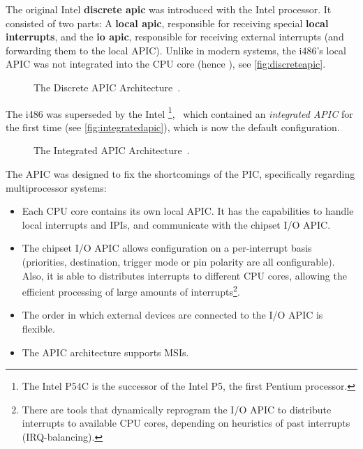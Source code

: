The original Intel  \textbf{\gls{discrete apic}} was introduced with the Intel  processor.
It consisted of two parts: A \textbf{\gls{local apic}}, responsible for receiving special \textbf{\glspl{local interrupt}}, and the \textbf{\gls{io apic}}, responsible for receiving external interrupts (and forwarding them to the local APIC).
Unlike in modern systems, the i486's local APIC was not integrated into the CPU core (hence ), see \autoref{fig:discreteapic}.

\begin{figure}[h]
  \centering
  \begin{subfigure}[b]{0.75\textwidth}
    
  \end{subfigure}
  \caption{The Discrete APIC Architecture~\autocite[sec.~5.1]{mpspec}.}
  \label{fig:discreteapic}
\end{figure}

The i486 was superseded by the Intel \footnote{
  The Intel P54C is the successor of the Intel P5, the first Pentium processor.},
\ which contained an \textit{integrated APIC} for the first time (see \autoref{fig:integratedapic}), which is now the default configuration.

\begin{figure}[h]
  \centering
  \begin{subfigure}[b]{0.75\textwidth}
    
  \end{subfigure}
  \caption{The Integrated APIC Architecture~\autocite[sec.~5.2]{mpspec}.}
  \label{fig:integratedapic}
\end{figure}

The APIC was designed to fix the shortcomings of the PIC, specifically regarding multiprocessor systems:

\begin{itemize}
  \item Each CPU core contains its own local APIC\@.
        It has the capabilities to handle local interrupts and IPIs, and communicate with the chipset I/O APIC\@.
  \item The chipset I/O APIC allows configuration on a per-interrupt basis (priorities, destination, trigger mode or pin polarity are all configurable).
        Also, it is able to distributes interrupts to different CPU cores, allowing the efficient processing of large amounts of interrupts\footnote{
          There are tools that dynamically reprogram the I/O APIC to distribute interrupts to available CPU cores, depending on heuristics of past interrupts (IRQ-balancing).}.
  \item The order in which external devices are connected to the I/O APIC is flexible.
  \item The APIC architecture supports MSIs.
\end{itemize}

